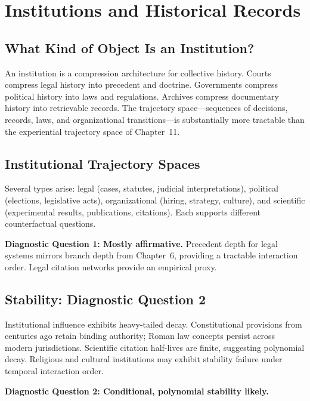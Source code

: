 \chapter{Institutions and Historical Records}

\section{What Kind of Object Is an Institution?}

An institution is a compression architecture for collective history. Courts compress legal history into precedent and doctrine. Governments compress political history into laws and regulations. Archives compress documentary history into retrievable records. The trajectory space---sequences of decisions, records, laws, and organizational transitions---is substantially more tractable than the experiential trajectory space of Chapter~11.

\section{Institutional Trajectory Spaces}

Several types arise: legal (cases, statutes, judicial interpretations), political (elections, legislative acts), organizational (hiring, strategy, culture), and scientific (experimental results, publications, citations). Each supports different counterfactual questions.

\textbf{Diagnostic Question 1: Mostly affirmative.} Precedent depth for legal systems mirrors branch depth from Chapter~6, providing a tractable interaction order. Legal citation networks \cite{LandesPosner1976} provide an empirical proxy.

\section{Stability: Diagnostic Question 2}

Institutional influence exhibits heavy-tailed decay. Constitutional provisions from centuries ago retain binding authority; Roman law concepts persist across modern jurisdictions. Scientific citation half-lives \cite{Price1965} are finite, suggesting polynomial decay. Religious and cultural institutions may exhibit stability failure under temporal interaction order.

\textbf{Diagnostic Question 2: Conditional, polynomial stability likely.}

